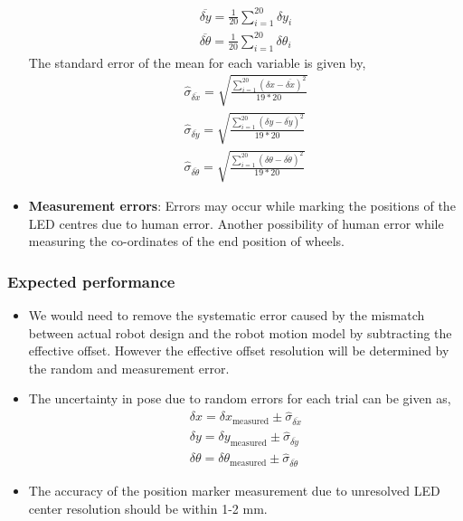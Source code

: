 \documentclass[11pt,a4paper,openright,twoside]{extreport}
\begin{document}
\begin{itemize}
\begin{align*}
\overline{\delta y} = \frac{1}{20} \sum_{i=1}^{20} \delta y_i \\
\overline{\delta \theta} = \frac{1}{20} \sum_{i=1}^{20} \delta \theta_i
\end{align*}
The standard error of the mean for each variable is given by,
\begin{align*}
\hat{\sigma}_{\overline{\delta x}} = \sqrt{\frac{\sum_{i=1}^{20} (\delta x - \overline{\delta x})^2}{19 * 20}} \\
\hat{\sigma}_{\overline{\delta y}} = \sqrt{\frac{\sum_{i=1}^{20} (\delta y - \overline{\delta y})^2}{19 * 20}} \\
\hat{\sigma}_{\overline{\delta \theta}} = \sqrt{\frac{\sum_{i=1}^{20} (\delta \theta - \overline{\delta \theta})^2}{19 * 20}}
\end{align*}

\item \textbf{Measurement errors}: Errors may occur while marking the positions of the LED centres due to human error. Another possibility of human error while measuring the co-ordinates of the end position of wheels.   

\end{itemize}


\subsubsection*{Expected performance}
\begin{itemize}
\item We would need to remove the systematic error caused by the mismatch between actual robot design and the robot motion model by subtracting the effective offset. However the effective offset resolution will be determined by the random and measurement error.
\item The uncertainty in pose due to random errors for each trial can be given as,
\begin{align*}
\delta x = \delta x_{\text{measured}} \pm \hat{\sigma}_{\overline{\delta x}} \\
\delta y = \delta y_{\text{measured}} \pm \hat{\sigma}_{\overline{\delta y}} \\
\delta \theta = \delta \theta_{\text{measured}} \pm \hat{\sigma}_{\overline{\delta \theta}}
\end{align*}
\item The accuracy of the position marker measurement due to unresolved LED center resolution should be within 1-2 mm.
\end{itemize}

\end{document}
